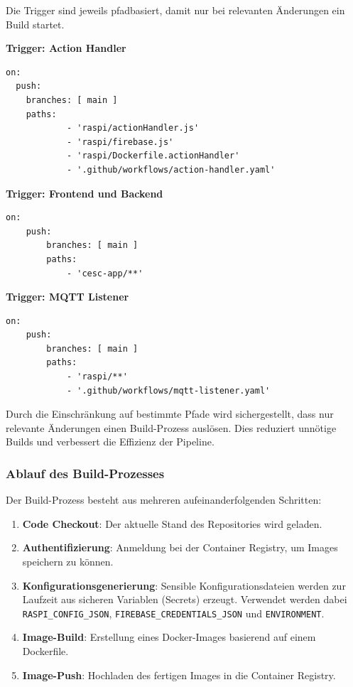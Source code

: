 Die Trigger sind jeweils pfadbasiert, damit nur bei relevanten Änderungen ein Build startet.

\textbf{Trigger: Action Handler}


\begin{verbatim}
on:
  push:
    branches: [ main ]
    paths:
            - 'raspi/actionHandler.js'
            - 'raspi/firebase.js'
            - 'raspi/Dockerfile.actionHandler'
            - '.github/workflows/action-handler.yaml'
\end{verbatim}

\textbf{Trigger: Frontend und Backend}


\begin{verbatim}
on:
    push:
        branches: [ main ]
        paths:
            - 'cesc-app/**'
\end{verbatim}

\textbf{Trigger: MQTT Listener}


\begin{verbatim}
on:
    push:
        branches: [ main ]
        paths:
            - 'raspi/**'
            - '.github/workflows/mqtt-listener.yaml'
\end{verbatim}

Durch die Einschränkung auf bestimmte Pfade wird sichergestellt, dass nur relevante Änderungen einen Build-Prozess auslösen. Dies reduziert unnötige Builds und verbessert die Effizienz der Pipeline.

\subsubsection{Ablauf des Build-Prozesses}

Der Build-Prozess besteht aus mehreren aufeinanderfolgenden Schritten:

\begin{enumerate}
    \item \textbf{Code Checkout}: Der aktuelle Stand des Repositories wird geladen.
    
    \item \textbf{Authentifizierung}: Anmeldung bei der Container Registry, um Images speichern zu können.
    
        \item \textbf{Konfigurationsgenerierung}: Sensible Konfigurationsdateien werden zur Laufzeit aus sicheren Variablen (Secrets) erzeugt. Verwendet werden dabei \texttt{RASPI\_CONFIG\_JSON}, \texttt{FIREBASE\_CREDENTIALS\_JSON} und \texttt{ENVIRONMENT}.
    
    \item \textbf{Image-Build}: Erstellung eines Docker-Images basierend auf einem Dockerfile.
    
    \item \textbf{Image-Push}: Hochladen des fertigen Images in die Container Registry.
\end{enumerate}

